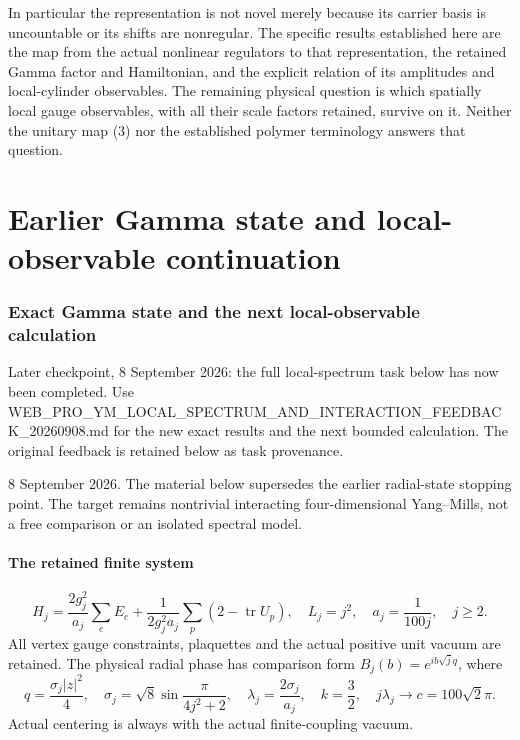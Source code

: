 \documentclass[
  11pt,
]{article}
\begin{document}
In particular the representation is not novel merely because its carrier
basis is uncountable or its shifts are nonregular. The specific results
established here are the map from the actual nonlinear regulators to
that representation, the retained Gamma factor and Hamiltonian, and the
explicit relation of its amplitudes and local-cylinder observables. The
remaining physical question is which spatially local gauge observables,
with all their scale factors retained, survive on it. Neither the
unitary map (3) nor the established polymer terminology answers that
question.

\clearpage
\part{Earlier Gamma state and local-observable continuation}
\section{Exact Gamma state and the next local-observable
calculation}\label{weak-coupling-part-9-exact-gamma-state-and-the-next-local-observable-calculation}

Later checkpoint, 8 September 2026: the full local-spectrum task below
has now been completed. Use
WEB\_PRO\_YM\_LOCAL\_SPECTRUM\_AND\_INTERACTION\_FEEDBACK\_20260908.md
for the new exact results and the next bounded calculation. The original
feedback is retained below as task provenance.

8 September 2026. The material below supersedes the earlier radial-state
stopping point. The target remains nontrivial interacting
four-dimensional Yang--Mills, not a free comparison or an isolated
spectral model.

\subsection{The retained finite
system}\label{weak-coupling-part-9-the-retained-finite-system}

\[
 H_j=\frac{2g_j^2}{a_j}\sum_eE_e+
       \frac1{2g_j^2a_j}\sum_p(2-\operatorname{tr}U_p),\quad
 L_j=j^2,\quad a_j=\frac1{100j},\quad j\ge2.
\] All vertex gauge constraints, plaquettes and the actual positive unit
vacuum are retained. The physical radial phase has comparison form
\(B_j(b)=e^{ib\sqrt j q}\), where \[
 q=\frac{\sigma_j|z|^2}{4},\quad
 \sigma_j=\sqrt8\sin\frac{\pi}{4j^2+2},\quad
 \lambda_j=\frac{2\sigma_j}{a_j},\quad k=\frac32,\quad
 j\lambda_j\longrightarrow c=100\sqrt2\pi.
\] Actual centering is always with the actual finite-coupling vacuum.
\end{document}
